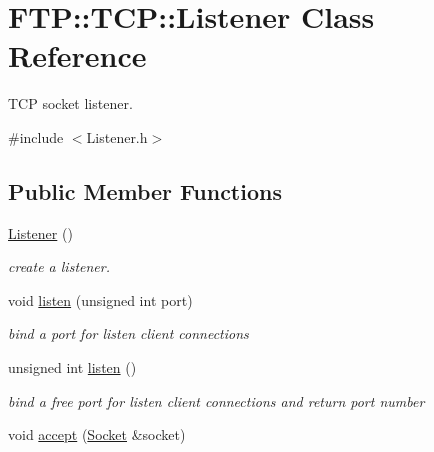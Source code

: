 \hypertarget{class_f_t_p_1_1_t_c_p_1_1_listener}{\section{F\-T\-P\-:\-:T\-C\-P\-:\-:Listener Class Reference}
\label{class_f_t_p_1_1_t_c_p_1_1_listener}
}


T\-C\-P socket listener.  




{\ttfamily \#include $<$Listener.\-h$>$}

\subsection*{Public Member Functions}
\begin{DoxyCompactItemize}
\item 
\hypertarget{class_f_t_p_1_1_t_c_p_1_1_listener_a69e4e544dd49c56e1d2cac10a314d90a}{\hyperlink{class_f_t_p_1_1_t_c_p_1_1_listener_a69e4e544dd49c56e1d2cac10a314d90a}{Listener} ()}\label{class_f_t_p_1_1_t_c_p_1_1_listener_a69e4e544dd49c56e1d2cac10a314d90a}

\begin{DoxyCompactList}\small\item\em create a listener. \end{DoxyCompactList}\item 
\hypertarget{class_f_t_p_1_1_t_c_p_1_1_listener_aafa6fa407abdfd638db25fb0d610252e}{void \hyperlink{class_f_t_p_1_1_t_c_p_1_1_listener_aafa6fa407abdfd638db25fb0d610252e}{listen} (unsigned int port)}\label{class_f_t_p_1_1_t_c_p_1_1_listener_aafa6fa407abdfd638db25fb0d610252e}

\begin{DoxyCompactList}\small\item\em bind a port for listen client connections \end{DoxyCompactList}\item 
\hypertarget{class_f_t_p_1_1_t_c_p_1_1_listener_abd151bda4845bec6533c75667499c21f}{unsigned int \hyperlink{class_f_t_p_1_1_t_c_p_1_1_listener_abd151bda4845bec6533c75667499c21f}{listen} ()}\label{class_f_t_p_1_1_t_c_p_1_1_listener_abd151bda4845bec6533c75667499c21f}

\begin{DoxyCompactList}\small\item\em bind a free port for listen client connections and return port number \end{DoxyCompactList}\item 
\hypertarget{class_f_t_p_1_1_t_c_p_1_1_listener_a2c3b3f387f91f07e4e3508ebba73c7c2}{void \hyperlink{class_f_t_p_1_1_t_c_p_1_1_listener_a2c3b3f387f91f07e4e3508ebba73c7c2}{accept} (\hyperlink{class_f_t_p_1_1_t_c_p_1_1_socket}{Socket} \&socket)}\label{class_f_t_p_1_1_t_c_p_1_1_listener_a2c3b3f387f91f07e4e3508ebba73c7c2}


\end{DoxyCompactItemize}
